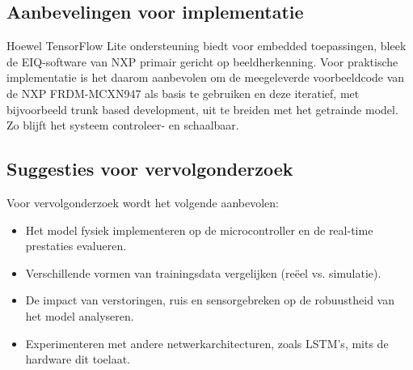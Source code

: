 \subsection{Aanbevelingen voor implementatie}
Hoewel TensorFlow Lite ondersteuning biedt voor embedded toepassingen, bleek de EIQ-software van NXP primair gericht op beeldherkenning. Voor praktische implementatie is het daarom aanbevolen om de meegeleverde voorbeeldcode van de NXP FRDM-MCXN947 als basis te gebruiken en deze iteratief, met bijvoorbeeld trunk based development, uit te breiden met het getrainde model. Zo blijft het systeem controleer- en schaalbaar.

\subsection{Suggesties voor vervolgonderzoek}
Voor vervolgonderzoek wordt het volgende aanbevolen:
\begin{itemize}
  \item Het model fysiek implementeren op de microcontroller en de real-time prestaties evalueren.
  \item Verschillende vormen van trainingsdata vergelijken (reëel vs. simulatie).
  \item De impact van verstoringen, ruis en sensorgebreken op de robuustheid van het model analyseren.
  \item Experimenteren met andere netwerkarchitecturen, zoals LSTM's, mits de hardware dit toelaat.
\end{itemize}




